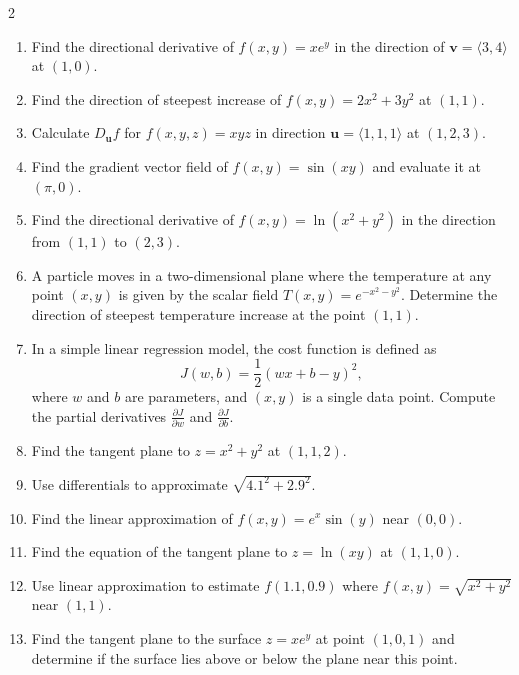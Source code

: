 \begin{multicols}{2}
\begin{enumerate}
    \item Find the directional derivative of $f(x,y) = xe^y$ in the direction of $\mathbf{v} = \langle 3,4 \rangle$ at $(1,0)$.
    
    \item Find the direction of steepest increase of $f(x,y) = 2x^2 + 3y^2$ at $(1,1)$.
    
    \item Calculate $D_{\mathbf{u}}f$ for $f(x,y,z) = xyz$ in direction $\mathbf{u} = \langle 1,1,1 \rangle$ at $(1,2,3)$.
    
    \item Find the gradient vector field of $f(x,y) = \sin(xy)$ and evaluate it at $(\pi,0)$.
    
    \item Find the directional derivative of $f(x,y) = \ln(x^2 + y^2)$ in the direction from $(1,1)$ to $(2,3)$.

    \item A particle moves in a two-dimensional plane where the temperature at any point $(x,y)$ is given by the scalar field \( T(x,y) = e^{-x^2 - y^2} \). Determine the direction of steepest temperature increase at the point \( (1,1) \).

    \item In a simple linear regression model, the cost function is defined as 
    \[
    J(w,b) = \frac{1}{2}(w x + b - y)^2,
    \]
    where \( w \) and \( b \) are parameters, and \( (x,y) \) is a single data point. Compute the partial derivatives \( \frac{\partial J}{\partial w} \) and \( \frac{\partial J}{\partial b} \).

    \item Find the tangent plane to $z = x^2 + y^2$ at $(1,1,2)$.
    
    \item Use differentials to approximate $\sqrt{4.1^2 + 2.9^2}$.
    
    \item Find the linear approximation of $f(x,y) = e^x\sin(y)$ near $(0,0)$.
    
    \item Find the equation of the tangent plane to $z = \ln(xy)$ at $(1,1,0)$.
    
    \item Use linear approximation to estimate $f(1.1,0.9)$ where $f(x,y) = \sqrt{x^2 + y^2}$ near $(1,1)$.
    
    \item Find the tangent plane to the surface $z = xe^y$ at point $(1,0,1)$ and determine if the surface lies above or below the plane near this point.


\end{enumerate}
\end{multicols}
